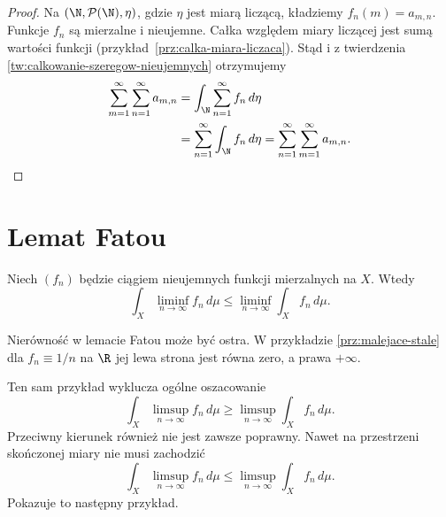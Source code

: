 \begin{proof}
Na $(\N,\mathcal P(\N),\eta)$, gdzie $\eta$ jest miarą liczącą,
kładziemy $f_n(m)=a_{m,n}$. Funkcje $f_n$ są mierzalne i nieujemne.
Całka względem miary liczącej jest sumą wartości funkcji
(przykład~\ref{prz:calka-miara-liczaca}). Stąd i z twierdzenia
\ref{tw:calkowanie-szeregow-nieujemnych} otrzymujemy
\begin{align*}
  \sum_{m=1}^\infty\sum_{n=1}^\infty a_{m,n}
  &=\int_\N\sum_{n=1}^\infty f_n\,d\eta\\
  &=\sum_{n=1}^\infty\int_\N f_n\,d\eta
  =\sum_{n=1}^\infty\sum_{m=1}^\infty a_{m,n}.
\end{align*}
\end{proof}

\section{Lemat Fatou}
\label{sec:lemat-fatou}

\begin{lemat}[Fatou]
\label{lem:fatou}
Niech $(f_n)$ będzie ciągiem nieujemnych funkcji mierzalnych na $X$.
Wtedy
\begin{equation}
  \int_X\liminf_{n\to\infty}f_n\,d\mu
  \leq\liminf_{n\to\infty}\int_X f_n\,d\mu.
  \label{eq:lemat-fatou}
\end{equation}
\end{lemat}

\begin{uwaga}
\label{uw:fatou-nierownosc-ostra}
Nierówność w lemacie Fatou może być ostra. W przykładzie
\ref{prz:malejace-stale} dla $f_n\equiv1/n$ na $\R$ jej lewa strona
jest równa zero, a prawa $+\infty$.

Ten sam przykład wyklucza ogólne oszacowanie
\[
  \int_X\limsup_{n\to\infty}f_n\,d\mu
  \geq\limsup_{n\to\infty}\int_X f_n\,d\mu.
\]
Przeciwny kierunek również nie jest zawsze poprawny. Nawet
na przestrzeni skończonej miary nie musi zachodzić
\[
  \int_X\limsup_{n\to\infty}f_n\,d\mu
  \leq\limsup_{n\to\infty}\int_X f_n\,d\mu.
\]
Pokazuje to następny przykład.
\end{uwaga}

